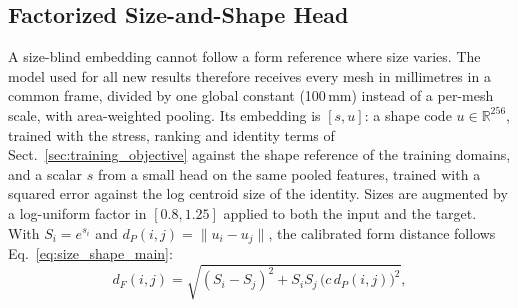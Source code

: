 \documentclass[10pt,twocolumn,letterpaper]{article}
\begin{document}
\subsection{Factorized Size-and-Shape Head}
\label{sec:factorized_head}
A size-blind embedding cannot follow a form reference where size varies. The model used for all new results therefore receives every mesh in millimetres in a common frame, divided by one global constant (100\,mm) instead of a per-mesh scale, with area-weighted pooling. Its embedding is $[s,u]$: a shape code $u\in\mathbb{R}^{256}$, trained with the stress, ranking and identity terms of Sect.~\ref{sec:training_objective} against the shape reference of the training domains, and a scalar $s$ from a small head on the same pooled features, trained with a squared error against the log centroid size of the identity. Sizes are augmented by a log-uniform factor in $[0.8,1.25]$ applied to both the input and the target. With $S_i=e^{s_i}$ and $d_P(i,j)=\|u_i-u_j\|$, the calibrated form distance follows Eq.~\eqref{eq:size_shape_main}:
\begin{equation}
d_F(i,j)=\sqrt{(S_i-S_j)^2+S_iS_j\,\big(c\,d_P(i,j)\big)^2},
\label{eq:factorized_distance}
\end{equation}
\end{document}
